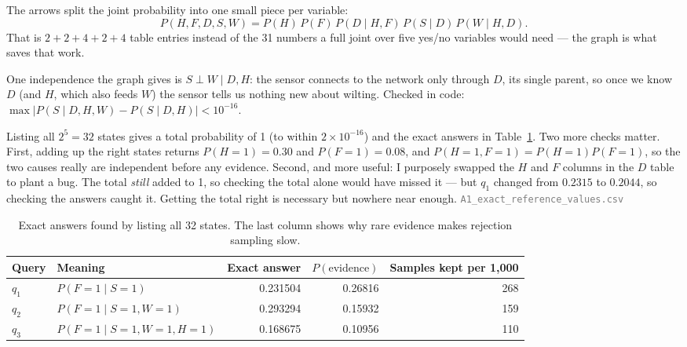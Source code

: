 \documentclass[12pt,a4paper]{article}
\newcommand{\file}[1]{\textcolor{gray}{\small\texttt{#1}}}
\begin{document}
\begin{minipage}[t]{0.26\textwidth}
\vspace{1pt}\centering
{}
\end{minipage}%
\begin{minipage}[t]{0.73\textwidth}
\vspace{3pt}
The arrows split the joint probability into one small piece per variable:
\[P(H,F,D,S,W)=P(H)\,P(F)\,P(D\mid H,F)\,P(S\mid D)\,P(W\mid H,D).\]
That is $2{+}2{+}4{+}2{+}4$ table entries instead of the 31 numbers a full joint over five yes/no variables
would need --- the graph is what saves that work.

One independence the graph gives is $S \perp W \mid D,H$: the sensor connects to the network only through
$D$, its single parent, so once we know $D$ (and $H$, which also feeds $W$) the sensor tells us nothing new
about wilting. Checked in code: $\max|P(S\mid D,H,W)-P(S\mid D,H)|<10^{-16}$.
\end{minipage}

\smallskip
Listing all $2^5=32$ states gives a total probability of 1 (to within $2\times10^{-16}$) and the exact
answers in Table~\ref{tab:Aexact}. Two more checks matter. First, adding up the right states returns
$P(H{=}1)=0.30$ and $P(F{=}1)=0.08$, and $P(H{=}1,F{=}1)=P(H{=}1)P(F{=}1)$, so the two causes really
are independent before any evidence. Second, and more useful: I purposely swapped the $H$ and $F$
columns in the $D$ table to plant a bug. The total \emph{still} added to 1, so checking the total alone
would have missed it --- but $q_1$ changed from $0.2315$ to $0.2044$, so checking the answers caught
it. Getting the total right is necessary but nowhere near enough.
\file{A1\_exact\_reference\_values.csv}

\begin{table}[H]\centering\small
\caption{Exact answers found by listing all 32 states. The last column shows why rare evidence makes
rejection sampling slow.}
\label{tab:Aexact}
\begin{tabular}{llrrr}
\toprule
Query & Meaning & Exact answer & $P(\text{evidence})$ & Samples kept per 1{,}000 \\
\midrule
$q_1$ & $P(F{=}1\mid S{=}1)$ & 0.231504 & 0.26816 & 268 \\
$q_2$ & $P(F{=}1\mid S{=}1,W{=}1)$ & 0.293294 & 0.15932 & 159 \\
$q_3$ & $P(F{=}1\mid S{=}1,W{=}1,H{=}1)$ & 0.168675 & 0.10956 & 110 \\
\bottomrule
\end{tabular}
\end{table}
\end{document}
